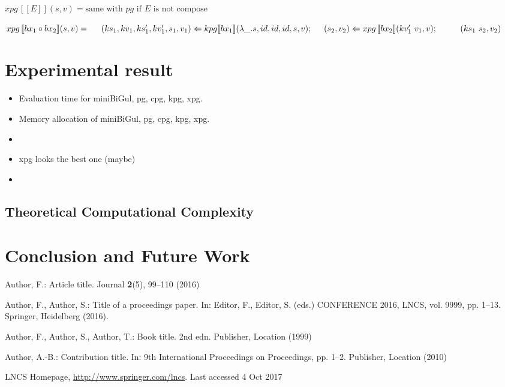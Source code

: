 \documentclass[runningheads]{llncs}
\newcommand{\tab}{\hspace*{5mm}}
\newcommand{\qtab}{\hspace*{5mm} \ \quad}
\newcommand{\kpg}[7]{kpg [\![#1]\!] (#2, #3, #4, #5, #6, #7)}
\newcommand{\xpg}[3]{xpg \, [\![#1]\!] (#2, #3)}
\begin{document}
$\xpg{E}{s}{v} = \text{same with } pg \text{ if } E \text{ is not compose}$

$\xpg{bx_1 \circ bx_2}{s}{v} =\\
    \tab (ks_1,kv_1, ks_1', kv_1', s_1, v_1) \Leftarrow \kpg{bx_1}{\lambda \_.s}{id}{id}{id}{s}{v};\\
    \tab (s_2, v_2) \Leftarrow \xpg{bx_2}{kv_1' \ v_1}{v};\\
    \qtab (ks_1 \ s_2, v_2)$

\section{Experimental result}

\begin{itemize}
\item Evaluation time for miniBiGul, pg, cpg, kpg, xpg.
\item Memory allocation of miniBiGul, pg, cpg, kpg, xpg.
\item []
\item xpg looks the best one (maybe)
\item 
\end{itemize}

\subsection{Theoretical Computational Complexity}

\section{Conclusion and Future Work}


% 
%
%
% 
% 
%
\begin{thebibliography}{8}
Author, F.: Article title. Journal \textbf{2}(5), 99--110 (2016)

Author, F., Author, S.: Title of a proceedings paper. In: Editor,
F., Editor, S. (eds.) CONFERENCE 2016, LNCS, vol. 9999, pp. 1--13.
Springer, Heidelberg (2016). 

Author, F., Author, S., Author, T.: Book title. 2nd edn. Publisher,
Location (1999)

Author, A.-B.: Contribution title. In: 9th International Proceedings
on Proceedings, pp. 1--2. Publisher, Location (2010)

LNCS Homepage, \url{http://www.springer.com/lncs}. Last accessed 4
Oct 2017
\end{thebibliography}
\end{document}
